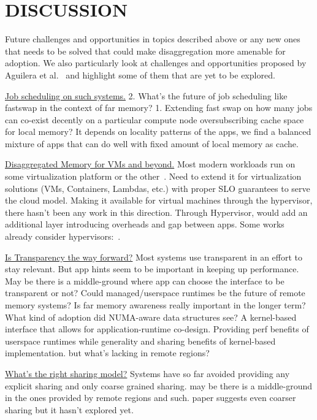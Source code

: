 \section{DISCUSSION}
\label{sec:discussion}
Future challenges and opportunities in topics described 
above or any new ones that needs to be solved that could 
make disaggregation more amenable for adoption.
We also particularly look at challenges and opportunities 
proposed by Aguilera et al.~\cite{Aguilera2017} and 
highlight some of them that are yet to be explored.


\vspace{3pt}
\noindent \uline{Job scheduling on such systems.}
2. What's the future of job scheduling like 
fastswap in the context of far memory? 
1. Extending fast swap on how many jobs can 
co-exist decently on a particular compute node 
oversubscribing cache space for local memory?
It depends on locality patterns of the apps,
we find a balanced mixture of apps that can 
do well with fixed amount of local memory
as cache.


\vspace{3pt}
\noindent \uline{Disaggregated Memory for VMs and beyond.}
Most modern workloads run on some virtualization platform 
or the other~\cite{Aguilera2017}. 
Need to extend it for virtualization solutions (VMs, Containers,
Lambdas, etc.) with proper SLO guarantees to serve the cloud model. 
Making it available for virtual machines through the 
hypervisor, there hasn't been any work in this direction.
Through Hypervisor, would add an additional layer 
introducing overheads and gap between apps. 
Some works already 
consider hypervisors:~\cite{Lim2012}. 


\vspace{3pt}
\noindent \uline{Is Transparency the way forward?}
Most systems use transparent in an effort to stay relevant.
But app hints seem to be important in keeping up performance.
May be there is a middle-ground where app can choose the 
interface to be transparent or not?
Could managed/userspace runtimes be the future of 
remote memory systems? Is far memory awareness really 
important in the longer term? What kind of adoption did 
NUMA-aware data structures see?
A kernel-based interface that allows for 
application-runtime co-design. Providing perf 
benefits of userspace runtimes while generality 
and sharing benefits of kernel-based 
implementation. but what's lacking in 
remote regions? 

\vspace{3pt}
\noindent \uline{What's the right sharing model?}
Systems have so far avoided providing any explicit
sharing and only coarse grained sharing. 
may be there is a middle-ground in the ones provided 
by remote regions and such. 
paper suggests even coarser sharing but it hasn't
explored yet.


